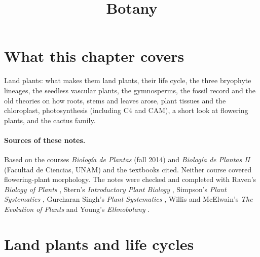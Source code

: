 



\title{Botany}
\maketitle

\label{section-phantom}

\tableofcontents

\section{What this chapter covers}
\label{section-overview}

Land plants: what makes them land plants,
their life cycle, the three bryophyte
lineages, the seedless vascular plants, the
gymnosperms, the fossil record and the old
theories on how roots, stems and leaves
arose, plant tissues and the chloroplast,
photosynthesis (including C4 and CAM), a
short look at flowering plants, and the
cactus family.

\paragraph{Sources of these notes.}
Based on the courses \emph{Biolog\'ia de
Plantas} (fall 2014) and \emph{Biolog\'ia de
Plantas II} (Facultad de Ciencias, UNAM)
and the textbooks cited. Neither
course covered flowering-plant morphology.
The notes were checked and completed with
Raven's \emph{Biology of Plants}
\cite{evert2013raven}, Stern's
\emph{Introductory Plant Biology}
\cite{stern2008introductory}, Simpson's
\emph{Plant Systematics}
\cite{simpson2006plant}, Gurcharan Singh's
\emph{Plant Systematics}
\cite{singh2010plant}, Willis and
McElwain's \emph{The Evolution of Plants}
\cite{willis2002evolution} and Young's
\emph{Ethnobotany}
\cite{young2007ethnobotany}.

\section{Land plants and life cycles}
\label{section-land-plants}

